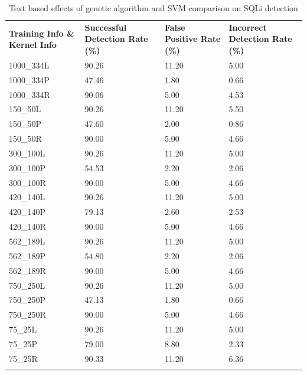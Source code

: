 \begin{appendices}
\begin{longtable}{|p{1.5in}|p{1in}|p{1in}|p{1in}|}
	\hline
	\textbf{Training Info \& Kernel Info} & \textbf{Successful Detection Rate (\%)} & \textbf{False Positive Rate (\%)} & \textbf{Incorrect Detection Rate (\%)}  \\
	\hhline{|=|=|=|=|}
	1000\_334L 	& 90.26 & 11.20 & 5.00 \\ \hline
	1000\_334P 	& 47.46 &  1.80 & 0.66 \\ \hline
	1000\_334R 	& 90.06 &  5.00 & 4.53 \\ \hline
	150\_50L 	& 90.26 & 11.20 & 5.50 \\ \hline
	150\_50P 	& 47.60 &  2.00 & 0.86 \\ \hline
	150\_50R 	& 90.00 &  5.00 & 4.66 \\ \hline
	300\_100L 	& 90.26 & 11.20 & 5.00 \\ \hline
	300\_100P 	& 54.53 &  2.20 & 2.06 \\ \hline
	300\_100R 	& 90.00 &  5.00 & 4.66 \\ \hline
	420\_140L 	& 90.26 & 11.20 & 5.00 \\ \hline
	420\_140P 	& 79.13 &  2.60 & 2.53 \\ \hline
	420\_140R 	& 90.00 &  5.00 & 4.66 \\ \hline
	562\_189L 	& 90.26 & 11.20 & 5.00 \\ \hline
	562\_189P 	& 54.80 &  2.20 & 2.06 \\ \hline
	562\_189R 	& 90.00 &  5.00 & 4.66 \\ \hline
	750\_250L 	& 90.26 & 11.20 & 5.00 \\ \hline
	750\_250P 	& 47.13 &  1.80 & 0.66 \\ \hline
	750\_250R 	& 90.00 &  5.00 & 4.66 \\ \hline
	75\_25L 		& 90.26 & 11.20 & 5.00 \\ \hline
	75\_25P 		& 79.00 &  8.80 & 2.33 \\ \hline
	75\_25R 		& 90.33 & 11.20 & 6.36 \\ \hline
	\caption{Text based effects of genetic algorithm and SVM comparison on SQLi detection}
\end{longtable}


\end{appendices}
